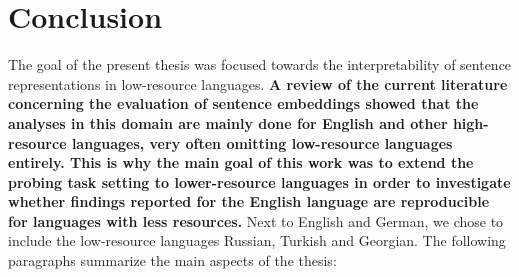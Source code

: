 %
%

\section{Conclusion}
\label{sec:conclusion}

The goal of the present thesis was focused towards the interpretability of sentence representations in low-resource languages. \textbf{A review of the current literature concerning the evaluation of sentence embeddings showed that the analyses in this domain are mainly done for English and other high-resource languages, very often omitting low-resource languages entirely. This is why the main goal of this work was to extend the probing task setting to lower-resource languages in order to investigate whether findings reported for the English language are reproducible for languages with less resources.} Next to English and German, we chose to include the low-resource languages Russian, Turkish and Georgian. The following paragraphs summarize the main aspects of the thesis:


